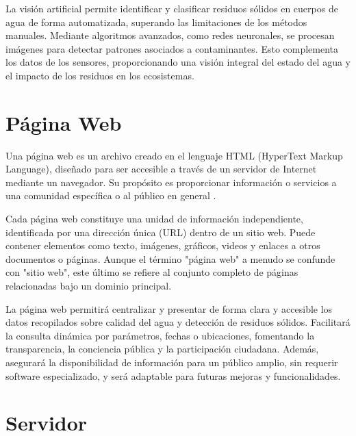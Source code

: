 La visión artificial permite identificar y clasificar residuos sólidos en cuerpos de agua de forma automatizada, superando las limitaciones de los métodos manuales. Mediante algoritmos avanzados, como redes neuronales, se procesan imágenes para detectar patrones asociados a contaminantes. Esto complementa los datos de los sensores, proporcionando una visión integral del estado del agua y el impacto de los residuos en los ecosistemas.


\section{Página Web}
Una página web es un archivo creado en el lenguaje HTML (HyperText Markup Language), diseñado para ser accesible a través de un servidor de Internet mediante un navegador. Su propósito es proporcionar información o servicios a una comunidad específica o al público en general \cite{redalyc2006}.

Cada página web constituye una unidad de información independiente, identificada por una dirección única (URL) dentro de un sitio web. Puede contener elementos como texto, imágenes, gráficos, videos y enlaces a otros documentos o páginas. Aunque el término "página web" a menudo se confunde con "sitio web", este último se refiere al conjunto completo de páginas relacionadas bajo un dominio principal.

La página web permitirá centralizar y presentar de forma clara y accesible los datos recopilados sobre calidad del agua y detección de residuos sólidos. Facilitará la consulta dinámica por parámetros, fechas o ubicaciones, fomentando la transparencia, la conciencia pública y la participación ciudadana. Además, asegurará la disponibilidad de información para un público amplio, sin requerir software especializado, y será adaptable para futuras mejoras y funcionalidades.


\section{Servidor}

